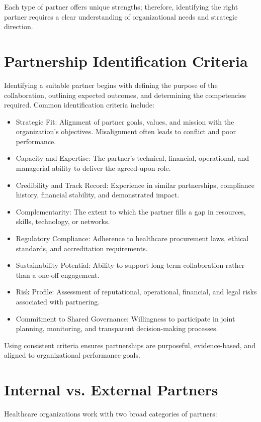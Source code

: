 \documentclass[10pt]{article}
\begin{document}
Each type of partner offers unique strengths; therefore, identifying the right partner requires a clear understanding of organizational needs and strategic direction.

\section*{Partnership Identification Criteria}
Identifying a suitable partner begins with defining the purpose of the collaboration, outlining expected outcomes, and determining the competencies required. Common identification criteria include:

\begin{itemize}
  \item Strategic Fit: Alignment of partner goals, values, and mission with the organization's objectives. Misalignment often leads to conflict and poor performance.
  \item Capacity and Expertise: The partner's technical, financial, operational, and managerial ability to deliver the agreed-upon role.
  \item Credibility and Track Record: Experience in similar partnerships, compliance history, financial stability, and demonstrated impact.
  \item Complementarity: The extent to which the partner fills a gap in resources, skills, technology, or networks.
  \item Regulatory Compliance: Adherence to healthcare procurement laws, ethical standards, and accreditation requirements.
  \item Sustainability Potential: Ability to support long-term collaboration rather than a one-off engagement.
  \item Risk Profile: Assessment of reputational, operational, financial, and legal risks associated with partnering.
  \item Commitment to Shared Governance: Willingness to participate in joint planning, monitoring, and transparent decision-making processes.
\end{itemize}

Using consistent criteria ensures partnerships are purposeful, evidence-based, and aligned to organizational performance goals.

\section*{Internal vs. External Partners}
Healthcare organizations work with two broad categories of partners:
\end{document}
